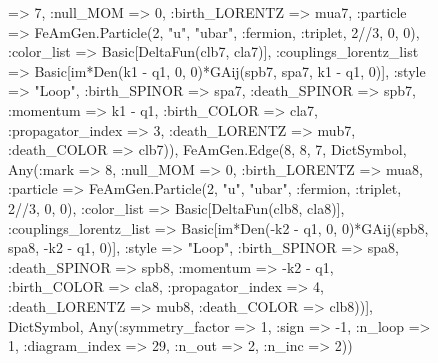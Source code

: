 \documentclass{revtex4}
\begin{document}
\begin{figure}[!htb]
\begin{center}
{=> 7, :null_MOM => 0, :birth_LORENTZ => mua7, :particle => FeAmGen.Particle(2, "u", "ubar", :fermion, :triplet, 2//3, 0, 0), :color_list => Basic[DeltaFun(clb7, cla7)], :couplings_lorentz_list => Basic[im*Den(k1 - q1, 0, 0)*GAij(spb7, spa7, k1 - q1, 0)], :style => "Loop", :birth_SPINOR => spa7, :death_SPINOR => spb7, :momentum => k1 - q1, :birth_COLOR => cla7, :propagator_index => 3, :death_LORENTZ => mub7, :death_COLOR => clb7)), FeAmGen.Edge(8, 8, 7, Dict{Symbol, Any}(:mark => 8, :null_MOM => 0, :birth_LORENTZ => mua8, :particle => FeAmGen.Particle(2, "u", "ubar", :fermion, :triplet, 2//3, 0, 0), :color_list => Basic[DeltaFun(clb8, cla8)], :couplings_lorentz_list => Basic[im*Den(-k2 - q1, 0, 0)*GAij(spb8, spa8, -k2 - q1, 0)], :style => "Loop", :birth_SPINOR => spa8, :death_SPINOR => spb8, :momentum => -k2 - q1, :birth_COLOR => cla8, :propagator_index => 4, :death_LORENTZ => mub8, :death_COLOR => clb8))], Dict{Symbol, Any}(:symmetry_factor => 1, :sign => -1, :n_loop => 1, :diagram_index => 29, :n_out => 2, :n_inc => 2)) 
}
\end{center}
\end{figure}
\end{document}

